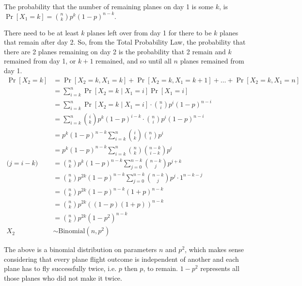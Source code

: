 \documentclass[11pt]{article}
\begin{document}
\begin{solution}
    
\begin{Parts}
    
\Part The probability that the number of remaining planes on day 1 is some $k$,
is $\Pr[X_1 = k] = \binom{n}{k} p^k (1-p)^{n-k}$.

\Part There need to be at least $k$ planes left over from day 1 for there to be
$k$ planes that remain after day 2. So, from the Total Probability Law, the 
probability that there are 2 planes remaining on day 2 is the probability that 
2 remain and $k$ remained from day 1, or $k+1$ remained, and so until all $n$
planes remained from day 1. 
\[
    \begin{split}
        \Pr[X_2 = k] &= \Pr[X_2 = k, X_1 = k] + \Pr[X_2 = k, X_1 = k + 1]
        + \dots + \Pr[X_2 = k, X_1 = n] \\
        &= \sum_{i=k}^{n} \Pr[X_2 = k \mid X_1 = i] \Pr[X_1 = i] \\
        &= \sum_{i=k}^{n} \Pr[X_2 = k \mid X_1 = i] \cdot \binom{n}{i} p^i (1-p)^{n-i} \\
        &= \sum_{i=k}^{n} \binom{i}{k} p^k (1-p)^{i-k} \cdot \binom{n}{i} p^i (1-p)^{n-i} \\
        &= p^k (1-p)^{n-k} \sum_{i=k}^{n} \binom{i}{k} \binom{n}{i} p^i \\
        &= p^k (1-p)^{n-k} \sum_{i=k}^{n} \binom{n}{k} \binom{n - k}{i - k} p^i \\
        \text{($j=i-k$)} \quad &= \binom{n}{k} p^k (1-p)^{n-k} \sum_{j=0}^{n-k} \binom{n - k}{j} p^{j+k} \\
        &= \binom{n}{k} p^{2k} (1-p)^{n-k} \sum_{j=0}^{n-k} \binom{n - k}{j} p^{j} \cdot 1^{n-k-j} \\
        &= \binom{n}{k} p^{2k} (1-p)^{n-k} (1+p)^{n-k} \\
        &= \binom{n}{k} p^{2k} \left( (1-p)(1+p) \right)^{n-k} \\
        &= \binom{n}{k} p^{2k} (1-p^2)^{n-k} \\
        X_2 &\sim \mathrm{Binomial}(n, p^2)
    \end{split}
\]

The above is a binomial distribution on parameters $n$ and $p^2$, which makes sense
considering that every plane flight outcome is independent of another and each
plane has to fly successfully twice, i.e. $p$ then $p$, to remain. $1-p^2$
represents all those planes who did not make it twice. 


\end{Parts}
\end{solution}
\end{document}
